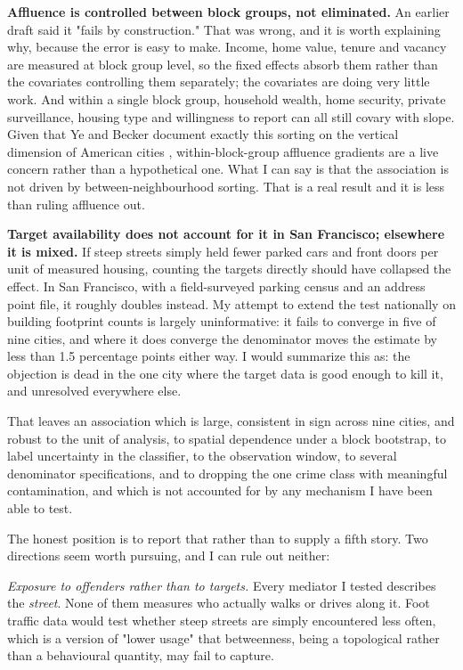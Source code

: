 \documentclass[11pt,letterpaper]{article}
\begin{document}
\textbf{Affluence is controlled between block groups, not eliminated.} An earlier
draft said it "fails by construction." That was wrong, and it is worth explaining
why, because the error is easy to make. Income, home value, tenure and vacancy are
measured at block group level, so the fixed effects absorb them rather than the
covariates controlling them separately; the covariates are doing very little work. And
within a single block group, household wealth, home security, private surveillance,
housing type and willingness to report can all still covary with slope. Given that Ye
and Becker document exactly this sorting on the vertical dimension of American cities
\cite{yebecker2018}, within-block-group affluence gradients are a live concern rather
than a hypothetical one. What I can say is that the association is not driven by
between-neighbourhood sorting. That is a real result and it is less than ruling
affluence out.

\textbf{Target availability does not account for it in San Francisco; elsewhere it is
mixed.} If steep streets simply held fewer parked cars and front doors per unit of
measured housing, counting the targets directly should have collapsed the effect. In
San Francisco, with a field-surveyed parking census and an address point file, it
roughly doubles instead. My attempt to extend the test nationally on building
footprint counts is largely uninformative: it fails to converge in five of nine
cities, and where it does converge the denominator moves the estimate by less than
1.5 percentage points either way. I would summarize this as: the objection is dead in
the one city where the target data is good enough to kill it, and unresolved
everywhere else.

That leaves an association which is large, consistent in sign across nine cities, and
robust to the unit of analysis, to spatial dependence under a block bootstrap, to
label uncertainty in the classifier, to the observation window, to several denominator
specifications, and to dropping the one crime class with meaningful contamination, and
which is not accounted for by any mechanism I have been able to test.

The honest position is to report that rather than to supply a fifth story. Two
directions seem worth pursuing, and I can rule out neither:

\emph{Exposure to offenders rather than to targets.} Every mediator I tested describes
the \emph{street}. None of them measures who actually walks or drives along it.
Foot traffic data would test whether steep streets are simply encountered less often,
which is a version of "lower usage" that betweenness, being a topological rather than
a behavioural quantity, may fail to capture.
\end{document}
